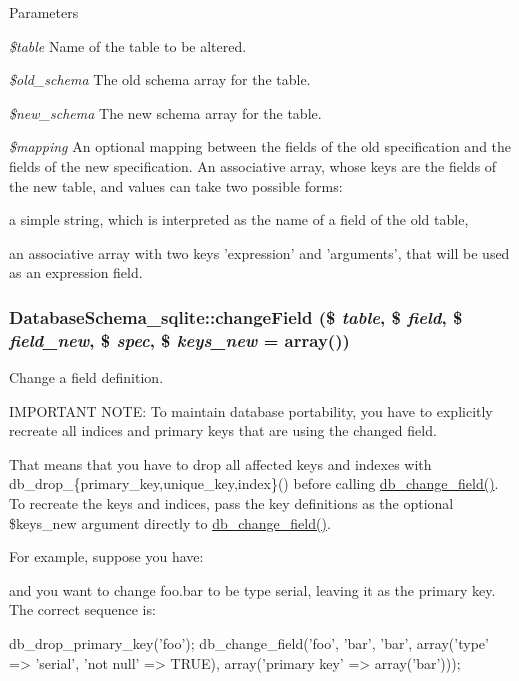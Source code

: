 \begin{DoxyParams}{Parameters}
\item[{\em \$table}]Name of the table to be altered. \item[{\em \$old\_\-schema}]The old schema array for the table. \item[{\em \$new\_\-schema}]The new schema array for the table. \item[{\em \$mapping}]An optional mapping between the fields of the old specification and the fields of the new specification. An associative array, whose keys are the fields of the new table, and values can take two possible forms:
\begin{DoxyItemize}
\item a simple string, which is interpreted as the name of a field of the old table,
\item an associative array with two keys 'expression' and 'arguments', that will be used as an expression field. 
\end{DoxyItemize}\end{DoxyParams}
\hypertarget{classDatabaseSchema__sqlite_ada4db729f33e2ac55a9d886f30b7b3ad}{
\subsubsection[{changeField}]{\setlength{\rightskip}{0pt plus 5cm}DatabaseSchema\_\-sqlite::changeField (\$ {\em table}, \/  \$ {\em field}, \/  \$ {\em field\_\-new}, \/  \$ {\em spec}, \/  \$ {\em keys\_\-new} = {\ttfamily array()})}}
\label{classDatabaseSchema__sqlite_ada4db729f33e2ac55a9d886f30b7b3ad}
Change a field definition.

IMPORTANT NOTE: To maintain database portability, you have to explicitly recreate all indices and primary keys that are using the changed field.

That means that you have to drop all affected keys and indexes with db\_\-drop\_\-\{primary\_\-key,unique\_\-key,index\}() before calling \hyperlink{group__schemaapi_ga9e0a4211eb8137e187d5f3f4fa716cea}{db\_\-change\_\-field()}. To recreate the keys and indices, pass the key definitions as the optional \$keys\_\-new argument directly to \hyperlink{group__schemaapi_ga9e0a4211eb8137e187d5f3f4fa716cea}{db\_\-change\_\-field()}.

For example, suppose you have: 
 and you want to change foo.bar to be type serial, leaving it as the primary key. The correct sequence is: 
\begin{DoxyCode}
 db_drop_primary_key('foo');
 db_change_field('foo', 'bar', 'bar',
   array('type' => 'serial', 'not null' => TRUE),
   array('primary key' => array('bar')));
\end{DoxyCode}


